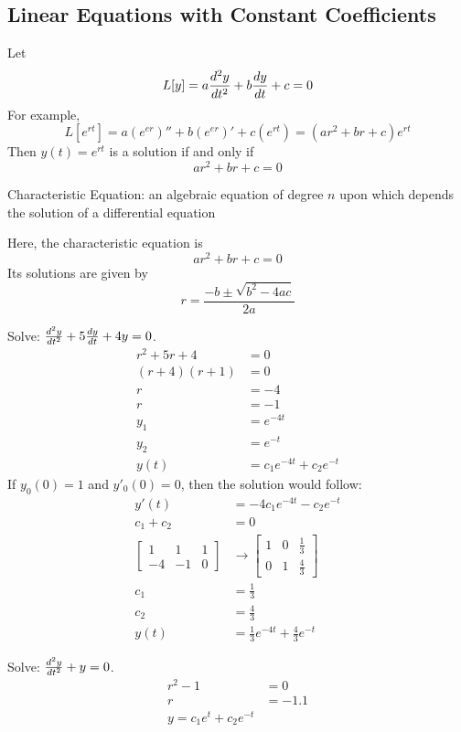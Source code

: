 \documentclass[12pt]{article}
\begin{document}
\subsection{Linear Equations with Constant Coefficients} 
Let $$L[y] = a\frac{d^2y}{dt^2} + b\frac{dy}{dt} + c = 0$$ For example, $$L[e^{rt}] = a(e^{er})'' + b(e^{er})' + c(e^{rt}) = (ar^2 + br + c)e^{rt} $$ Then $y(t) = e^{rt}$ is a solution if and only if $$ar^2 + br + c = 0$$ 
\begin{definition} Characteristic Equation: an algebraic equation of degree $n$ upon which depends the solution of a differential equation \end{definition} 
Here, the characteristic equation is $$ar^2 + br + c = 0$$ Its solutions are given by $$r = \frac{-b \pm \sqrt{b^2 - 4ac}}{2a} $$ 
\begin{example} Solve: $\frac{d^2y}{dt^2} + 5\frac{dy}{dt} + 4y = 0$. $$\begin{aligned} r^2 + 5r + 4 &= 0 \\ (r + 4)(r + 1) &= 0 \\ r &= -4 \\ r &= -1 \\ y_1 &= e^{-4t} \\ y_2 &= e^{-t} \\ y(t) &= c_1e^{-4t} + c_2e^{-t} \end{aligned} $$
If $y_0(0) = 1$ and $y'_0(0) = 0$, then the solution would follow: $$\begin{aligned} y'(t) &= -4c_1e^{-4t} - c_2e^{-t} \\ c_1 + c_2 &= 0 \\ \begin{bmatrix} 1 & 1 & 1 \\ -4 & -1 & 0 \end{bmatrix} &\to \begin{bmatrix} 1 & 0 & \frac{1}{3} \\ 0 & 1 & \frac{4}{3} \end{bmatrix}  \\ c_1 &= \frac{1}{3} \\ c_2 &= \frac{4}{3} \\ y(t) &= \frac{1}{3}e^{-4t} + \frac{4}{3}e^{-t} \end{aligned} $$ \end{example} 
\begin{example} Solve: $\frac{d^2y}{dt^2} + y = 0$. $$\begin{aligned} r^2 - 1 &= 0 \\ r &= -1. 1\\ y = c_1e^t + c_2e^{-t} \end{aligned} $$ \end{example}
\end{document}

